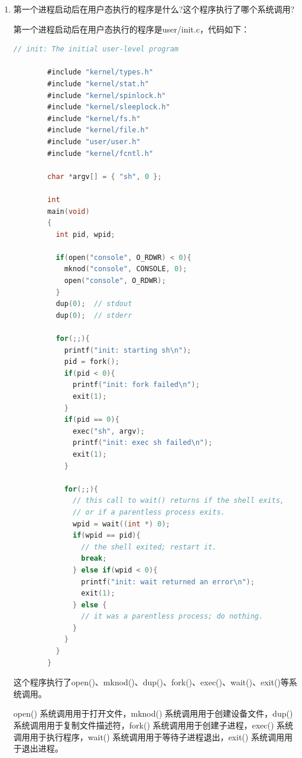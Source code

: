 \documentclass[UTF8]{article}
\begin{document}
\begin{enumerate}
    \item 第一个进程启动后在用户态执行的程序是什么?这个程序执行了哪个系统调用?
    
    第一个进程启动后在用户态执行的程序是user/init.c，代码如下：

    \begin{lstlisting}[language=C]
        // init: The initial user-level program

        #include "kernel/types.h"
        #include "kernel/stat.h"
        #include "kernel/spinlock.h"
        #include "kernel/sleeplock.h"
        #include "kernel/fs.h"
        #include "kernel/file.h"
        #include "user/user.h"
        #include "kernel/fcntl.h"
        
        char *argv[] = { "sh", 0 };
        
        int
        main(void)
        {
          int pid, wpid;
        
          if(open("console", O_RDWR) < 0){
            mknod("console", CONSOLE, 0);
            open("console", O_RDWR);
          }
          dup(0);  // stdout
          dup(0);  // stderr
        
          for(;;){
            printf("init: starting sh\n");
            pid = fork();
            if(pid < 0){
              printf("init: fork failed\n");
              exit(1);
            }
            if(pid == 0){
              exec("sh", argv);
              printf("init: exec sh failed\n");
              exit(1);
            }
        
            for(;;){
              // this call to wait() returns if the shell exits,
              // or if a parentless process exits.
              wpid = wait((int *) 0);
              if(wpid == pid){
                // the shell exited; restart it.
                break;
              } else if(wpid < 0){
                printf("init: wait returned an error\n");
                exit(1);
              } else {
                // it was a parentless process; do nothing.
              }
            }
          }
        }
    \end{lstlisting}
    
    这个程序执行了open()、mknod()、dup()、fork()、exec()、wait()、exit()等系统调用。

    open() 系统调用用于打开文件，mknod() 系统调用用于创建设备文件，dup() 系统调用用于复制文件描述符，fork() 系统调用用于创建子进程，exec() 系统调用用于执行程序，wait() 系统调用用于等待子进程退出，exit() 系统调用用于退出进程。


\end{enumerate}
\end{document}
